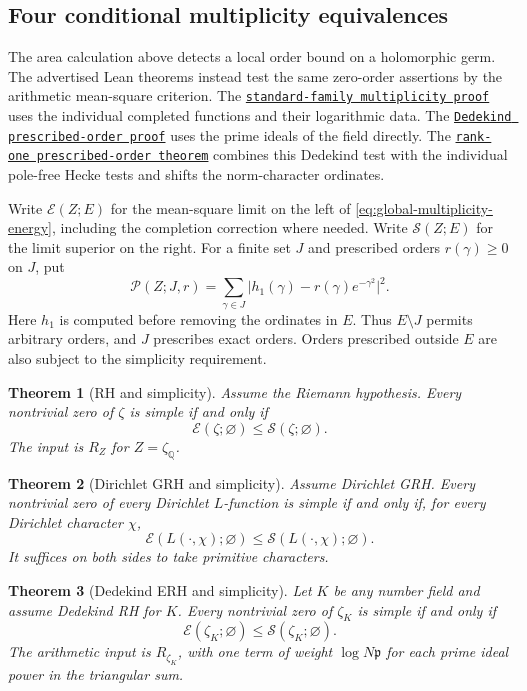 \documentclass[11pt]{amsart}
\newtheorem{theorem}{Theorem}[section]
\theoremstyle{definition}
\theoremstyle{remark}
\numberwithin{equation}{section}
\newcommand{\repositoryurl}{https://github.com/kimihiro64/Robin1984}
\newcommand{\proofrevision}{b359826e62c50b6cef55db4b2fcab793232498cc}
\newcommand{\codelink}[2]{%
  \href{\repositoryurl/blob/\proofrevision/#1}{\texttt{#2}}}
\begin{document}
\subsection{Four conditional multiplicity equivalences}

The area calculation above detects a local order bound on a
holomorphic germ. The advertised Lean theorems instead test the
same zero-order assertions by the arithmetic mean-square criterion.
The \codelink{Robin1984/GRH/StandardAutomorphicMultiplicity.lean\#L90}{standard-family multiplicity proof}
uses the individual completed functions and their logarithmic
data. The \codelink{Robin1984/GRH/DedekindTriangular.lean\#L539}{Dedekind prescribed-order proof}
uses the prime ideals of the field directly. The
\codelink{Robin1984/GRH/HeckeStandardRankOne.lean\#L80}{rank-one prescribed-order theorem}
combines this Dedekind test with the individual pole-free Hecke
tests and shifts the norm-character ordinates.

Write \(\mathcal E(Z;E)\) for the mean-square limit on the left of
\eqref{eq:global-multiplicity-energy}, including the completion
correction where needed. Write \(\mathcal S(Z;E)\) for the limit superior
on the right. For a finite set \(J\) and prescribed
orders \(r(\gamma)\ge0\) on \(J\), put
\[
 \mathcal P(Z;J,r)
 =\sum_{\gamma\in J}
       \bigl|h_1(\gamma)-r(\gamma)e^{-\gamma^2}\bigr|^2.
\]
Here \(h_1\) is computed before removing the ordinates in \(E\).
Thus \(E\setminus J\) permits arbitrary orders, and \(J\) prescribes
exact orders. Orders prescribed outside \(E\) are also subject to the
simplicity requirement.

\begin{theorem}[RH and simplicity]\label{thm:rh-multiplicity}
Assume the Riemann hypothesis. Every nontrivial zero of \(\zeta\)
is simple if and only if
\[
 \mathcal E(\zeta;\varnothing)\le\mathcal S(\zeta;\varnothing).
\]
The input is \(R_Z\) for \(Z=\zeta_{\mathbb Q}\).
\end{theorem}

\begin{theorem}[Dirichlet GRH and simplicity]\label{thm:grh-multiplicity}
Assume Dirichlet GRH. Every nontrivial zero of every Dirichlet
\(L\)-function is simple if and only if, for every Dirichlet character
\(\chi\),
\[
 \mathcal E(L(\cdot,\chi);\varnothing)
 \le\mathcal S(L(\cdot,\chi);\varnothing).
\]
It suffices on both sides to take primitive characters.
\end{theorem}

\begin{theorem}[Dedekind ERH and simplicity]\label{thm:erh-multiplicity}
Let \(K\) be any number field and assume Dedekind RH for \(K\).
Every nontrivial zero of \(\zeta_K\) is simple if and only if
\[
 \mathcal E(\zeta_K;\varnothing)\le\mathcal S(\zeta_K;\varnothing).
\]
The arithmetic input is \(R_{\zeta_K}\), with one term of weight
\(\log N\mathfrak p\) for each prime ideal power in the triangular sum.
\end{theorem}
\end{document}
